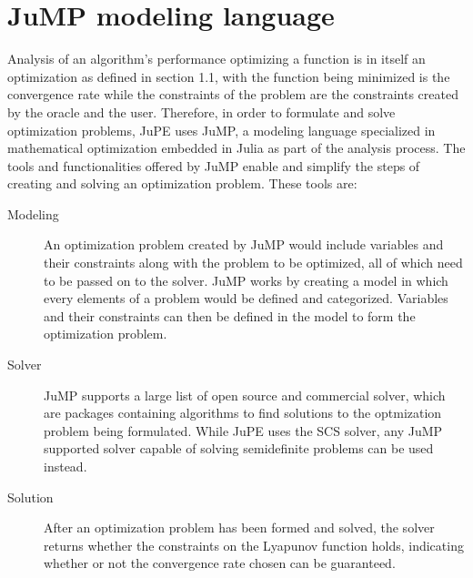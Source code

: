 \section{JuMP modeling language}
Analysis of an algorithm's performance optimizing a function is in itself an optimization as defined in section 1.1, with the function being minimized is the convergence rate while the constraints of the problem are the constraints created by the oracle and the user. Therefore, in order to formulate and solve optimization problems, JuPE uses JuMP, a modeling language specialized in mathematical optimization embedded in Julia as part of the analysis process. The tools and functionalities offered by JuMP enable and simplify the steps of creating and solving an optimization problem. These tools are:

\begin{description}
	\item[Modeling] An optimization problem created by JuMP would include variables and their constraints along with the problem to be optimized, all of which need to be passed on to the solver. JuMP works by creating a model in which every elements of a problem would be defined and categorized. Variables and their constraints can then be defined in the model to form the optimization problem.
	\item[Solver] JuMP supports a large list of open source and commercial solver, which are packages containing algorithms to find solutions to the optmization problem being formulated. While JuPE uses the SCS \cite{SCS} solver, any JuMP supported solver capable of solving semidefinite problems can be used instead.
	\item[Solution] After an optimization problem has been formed and solved, the solver returns whether the constraints on the Lyapunov function holds, indicating whether or not the convergence rate chosen can be guaranteed. 	 
\end{description}